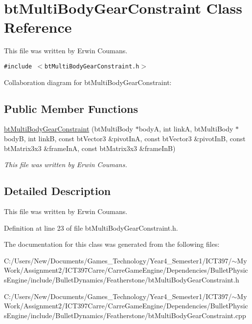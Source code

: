 \hypertarget{classbt_multi_body_gear_constraint}{
\section{btMultiBodyGearConstraint Class Reference}
\label{classbt_multi_body_gear_constraint}
}
This file was written by Erwin Coumans.  


{\tt \#include $<$btMultiBodyGearConstraint.h$>$}

Collaboration diagram for btMultiBodyGearConstraint:\subsection*{Public Member Functions}
\begin{CompactItemize}
\item 
\hypertarget{classbt_multi_body_gear_constraint_9c4d40e6e77a31a818287620504cab76}{
\hyperlink{classbt_multi_body_gear_constraint_9c4d40e6e77a31a818287620504cab76}{btMultiBodyGearConstraint} (btMultiBody $\ast$bodyA, int linkA, btMultiBody $\ast$bodyB, int linkB, const btVector3 \&pivotInA, const btVector3 \&pivotInB, const btMatrix3x3 \&frameInA, const btMatrix3x3 \&frameInB)}
\label{classbt_multi_body_gear_constraint_9c4d40e6e77a31a818287620504cab76}

\begin{CompactList}\small\item\em This file was written by Erwin Coumans. \item\end{CompactList}\end{CompactItemize}


\subsection{Detailed Description}
This file was written by Erwin Coumans. 

Definition at line 23 of file btMultiBodyGearConstraint.h.

The documentation for this class was generated from the following files:\begin{CompactItemize}
\item 
C:/Users/New/Documents/Games\_\-Technology/Year4\_\-Semester1/ICT397/$\sim$My Work/Assignment2/ICT397Carre/CarreGameEngine/Dependencies/BulletPhysicsEngine/include/BulletDynamics/Featherstone/btMultiBodyGearConstraint.h\item 
C:/Users/New/Documents/Games\_\-Technology/Year4\_\-Semester1/ICT397/$\sim$My Work/Assignment2/ICT397Carre/CarreGameEngine/Dependencies/BulletPhysicsEngine/include/BulletDynamics/Featherstone/btMultiBodyGearConstraint.cpp\end{CompactItemize}
